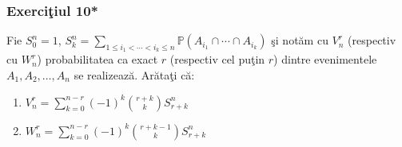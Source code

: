 \documentclass[]{article}
\def\PP{{\mathbb P}}
\begin{document}
\subsubsection{\texorpdfstring{Exerci\c tiul
10*}{Exerciiul 10*}}\label{exerciiul-10}

Fie \(S_{0}^{n}=1\),
\(S_{k}^{n}=\displaystyle\sum_{1\leq i_1<\cdots<i_k\leq n}\PP\left(A_{i_1}\cap\cdots\cap A_{i_k}\right)\)
\c si not\u am cu \(V_{n}^{r}\) (respectiv cu \(W_{n}^{r}\))
probabilitatea ca exact \(r\) (respectiv cel pu\c tin \(r\)) dintre
evenimentele \(A_1, A_2, \dots, A_n\) se realizeaz\u a. Ar\u ata\c ti
c\u a:

\begin{enumerate}
\def\labelenumi{\alph{enumi})}
\item
  \(V_{n}^{r}=\displaystyle\sum_{k=0}^{n-r}(-1)^k\binom{r+k}{k}S_{r+k}^{n}\)
\item
  \(W_{n}^{r}=\displaystyle\sum_{k=0}^{n-r}(-1)^k\binom{r+k-1}{k}S_{r+k}^{n}\)
\end{enumerate}
\end{document}
